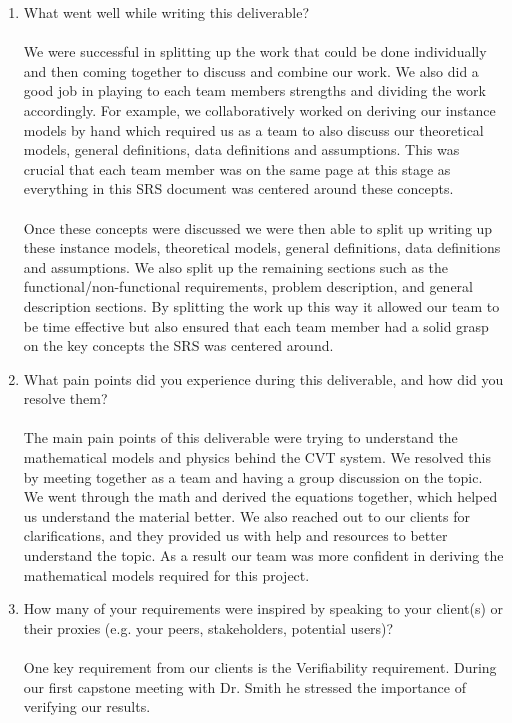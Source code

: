 \documentclass[12pt]{article}
\begin{document}
\begin{enumerate}
  \item What went well while writing this deliverable?
  \\\\
  We were successful in splitting up the work that could be done individually and then coming together to discuss and combine our work.
  We also did a good job in playing to each team members strengths and dividing the work accordingly. 
  For example, we collaboratively worked on deriving our instance models by hand which required us as a team to also discuss our theoretical models, general definitions, data definitions and assumptions. 
  This was crucial that each team member was on the same page at this stage as everything in this SRS document was centered around these concepts.
  \\\\
  Once these concepts were discussed we were then able to split up writing up these instance models, theoretical models, general definitions, data definitions and assumptions. 
  We also split up the remaining sections such as the functional/non-functional requirements, problem description, and general description sections. 
  By splitting the work up this way it allowed our team to be time effective but also ensured that each team member had a solid grasp on the key concepts the SRS was centered around.  
  \item What pain points did you experience during this deliverable, and how did
  you resolve them?
  \\\\
  The main pain points of this deliverable were trying to understand the mathematical models and physics behind the CVT system.
  We resolved this by meeting together as a team and having a group discussion on the topic.
  We went through the math and derived the equations together, which helped us understand the material better.
  We also reached out to our clients for clarifications, and they provided us with help and resources to better understand the topic. 
  As a result our team was more confident in deriving the mathematical models required for this project.   
  \item How many of your requirements were inspired by speaking to your
  client(s) or their proxies (e.g. your peers, stakeholders, potential users)?
  \\\\
  One key requirement from our clients is the Verifiability requirement.
  During our first capstone meeting with Dr. Smith he stressed the importance of verifying our results.

\end{enumerate}
\end{document}
